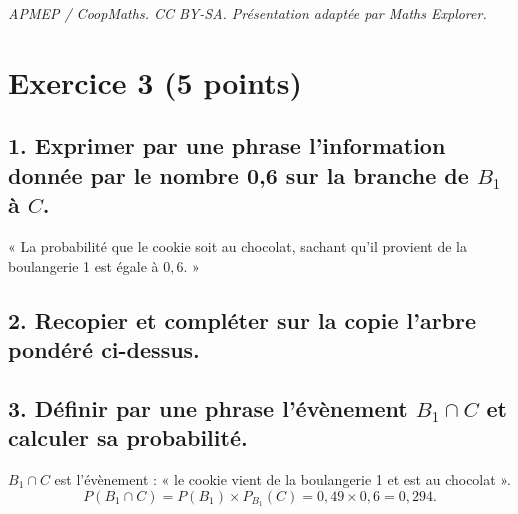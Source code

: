 \documentclass[10pt]{article}
\begin{document}
\noindent\textit{APMEP / CoopMaths. CC BY-SA. Présentation adaptée par Maths Explorer.}\par\medskip
\section*{Exercice 3 (5 points)}
	

	

	
	\subsection*{1. Exprimer par une phrase l’information donnée par le nombre 0,6 sur la branche de \(B_1\) à \(C\).}
	
	« La probabilité que le cookie soit au chocolat, sachant qu’il provient de la boulangerie 1 est égale à $0,6$. »
	
	\subsection*{2. Recopier et compléter sur la copie l’arbre pondéré ci-dessus.}
	
	\begin{center}
\end{center}
	
	\subsection*{3. Définir par une phrase l’évènement \(B_1 \cap C\) et calculer sa probabilité.}
	
	\(B_1 \cap C\) est l’évènement : « le cookie vient de la boulangerie 1 et est au chocolat ».
	\[ P(B_1 \cap C) = P(B_1) \times P_{B_1}(C) = 0,49 \times 0,6 = 0,294. \]
	
\end{document}
